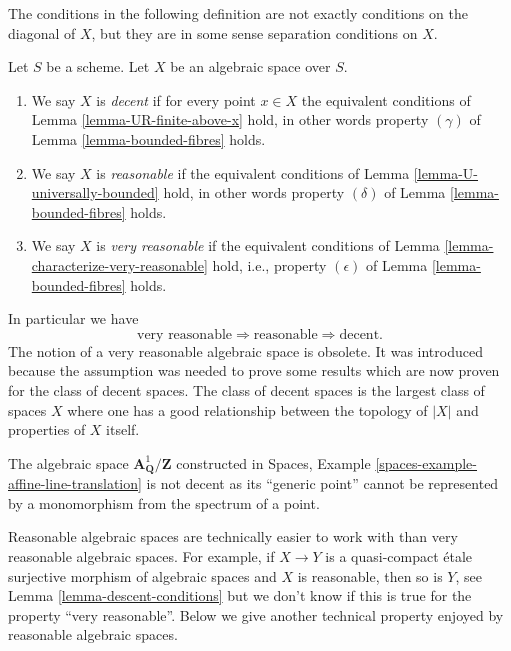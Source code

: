 \medskip\noindent
The conditions in the following definition
are not exactly conditions on the diagonal of $X$, but they are in some
sense separation conditions on $X$.

\begin{definition}
\label{definition-very-reasonable}
Let $S$ be a scheme.
Let $X$ be an algebraic space over $S$.
\begin{enumerate}
\item We say $X$ is {\it decent} if for every point $x \in X$ the equivalent
conditions of
Lemma \ref{lemma-UR-finite-above-x}
hold, in other words property $(\gamma)$ of
Lemma \ref{lemma-bounded-fibres}
holds.
\item We say $X$ is {\it reasonable} if the equivalent conditions of
Lemma \ref{lemma-U-universally-bounded}
hold, in other words property $(\delta)$ of
Lemma \ref{lemma-bounded-fibres}
holds.
\item We say $X$ is {\it very reasonable} if the equivalent conditions of
Lemma \ref{lemma-characterize-very-reasonable}
hold, i.e., property $(\epsilon)$ of
Lemma \ref{lemma-bounded-fibres}
holds.
\end{enumerate}
\end{definition}

\noindent
In particular we have
$$
\text{very reasonable} \Rightarrow
\text{reasonable} \Rightarrow
\text{decent}.
$$
The notion of a very reasonable algebraic space is obsolete.
It was introduced because the assumption was needed to prove some results
which are now proven for the class of decent spaces.
The class of decent spaces is the largest class of spaces $X$ where one has
a good relationship between the topology of $|X|$ and
properties of $X$ itself.

\begin{example}
\label{example-not-decent}
The algebraic space $\mathbf{A}^1_{\mathbf{Q}}/\mathbf{Z}$ constructed in
Spaces, Example \ref{spaces-example-affine-line-translation}
is not decent as its ``generic point'' cannot be represented by a monomorphism
from the spectrum of a point.
\end{example}

\begin{remark}
\label{remark-reasonable}
Reasonable algebraic spaces are technically easier to work with than very
reasonable algebraic spaces. For example, if $X \to Y$ is a quasi-compact
\'etale surjective morphism of algebraic spaces and $X$ is reasonable, then
so is $Y$, see
Lemma \ref{lemma-descent-conditions}
but we don't know if this is true for the property ``very reasonable''.
Below we give another technical property enjoyed by reasonable
algebraic spaces.
\end{remark}

